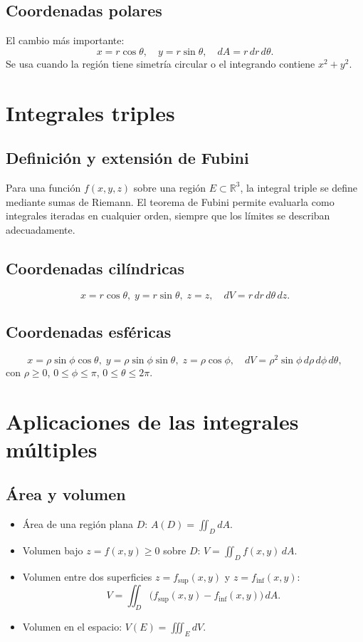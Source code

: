 \documentclass[12pt,spanish]{article}
\newcommand{\RR}{\mathbb{R}}
\begin{document}
\subsection{Coordenadas polares}
El cambio más importante:
\[
x = r\cos\theta,\quad y = r\sin\theta,\quad dA = r\,dr\,d\theta.
\]
Se usa cuando la región tiene simetría circular o el integrando contiene $x^2+y^2$.

\section{Integrales triples}

\subsection{Definición y extensión de Fubini}
Para una función $f(x,y,z)$ sobre una región $E\subset\RR^3$, la integral triple se define mediante sumas de Riemann. El teorema de Fubini permite evaluarla como integrales iteradas en cualquier orden, siempre que los límites se describan adecuadamente.

\subsection{Coordenadas cilíndricas}
\[
x = r\cos\theta,\; y = r\sin\theta,\; z = z,\quad dV = r\,dr\,d\theta\,dz.
\]

\subsection{Coordenadas esféricas}
\[
x = \rho\sin\phi\cos\theta,\; y = \rho\sin\phi\sin\theta,\; z = \rho\cos\phi,\quad dV = \rho^2\sin\phi\,d\rho\,d\phi\,d\theta,
\]
con $\rho\ge0$, $0\le\phi\le\pi$, $0\le\theta\le2\pi$.

\section{Aplicaciones de las integrales múltiples}

\subsection{Área y volumen}
\begin{itemize}
\item Área de una región plana $D$: $\displaystyle A(D)=\iint_D dA$.
\item Volumen bajo $z=f(x,y)\ge0$ sobre $D$: $\displaystyle V=\iint_D f(x,y)\,dA$.
\item Volumen entre dos superficies $z=f_{\text{sup}}(x,y)$ y $z=f_{\text{inf}}(x,y)$:
\[
V=\iint_D \bigl(f_{\text{sup}}(x,y)-f_{\text{inf}}(x,y)\bigr)\,dA.
\]
\item Volumen en el espacio: $\displaystyle V(E)=\iiint_E dV$.
\end{itemize}
\end{document}
